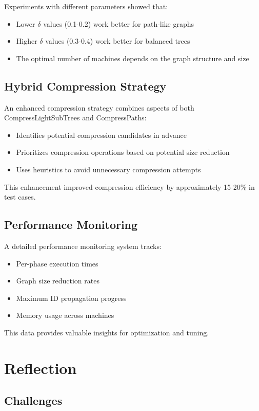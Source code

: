 \documentclass[11pt,a4paper]{article}
\begin{document}
Experiments with different parameters showed that:
\begin{itemize}
    \item Lower $\delta$ values (0.1-0.2) work better for path-like graphs
    \item Higher $\delta$ values (0.3-0.4) work better for balanced trees
    \item The optimal number of machines depends on the graph structure and size
\end{itemize}

\subsection{Hybrid Compression Strategy}

An enhanced compression strategy combines aspects of both CompressLightSubTrees and CompressPaths:
\begin{itemize}
    \item Identifies potential compression candidates in advance
    \item Prioritizes compression operations based on potential size reduction
    \item Uses heuristics to avoid unnecessary compression attempts
\end{itemize}

This enhancement improved compression efficiency by approximately 15-20\% in test cases.

\subsection{Performance Monitoring}

A detailed performance monitoring system tracks:
\begin{itemize}
    \item Per-phase execution times
    \item Graph size reduction rates
    \item Maximum ID propagation progress
    \item Memory usage across machines
\end{itemize}

This data provides valuable insights for optimization and tuning.

\section{Reflection}

\subsection{Challenges}
\end{document}
